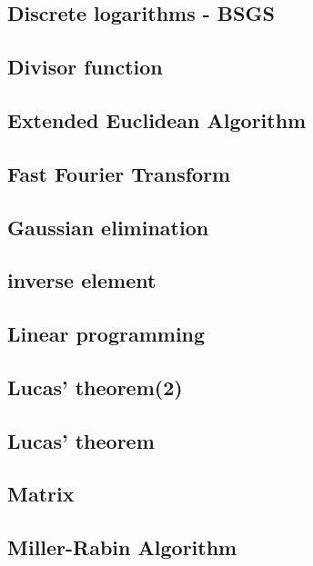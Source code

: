 \documentclass[a4paper,5pt,twocolumn,titlepage]{article}
\begin{document}
\subsection{Discrete logarithms - BSGS}

\subsection{Divisor function}

\subsection{Extended Euclidean Algorithm}

\subsection{Fast Fourier Transform}

\subsection{Gaussian elimination}

\subsection{inverse element}

\subsection{Linear programming}

\subsection{Lucas' theorem(2)}

\subsection{Lucas' theorem}

\subsection{Matrix}

\subsection{Miller-Rabin Algorithm}

\end{document}
